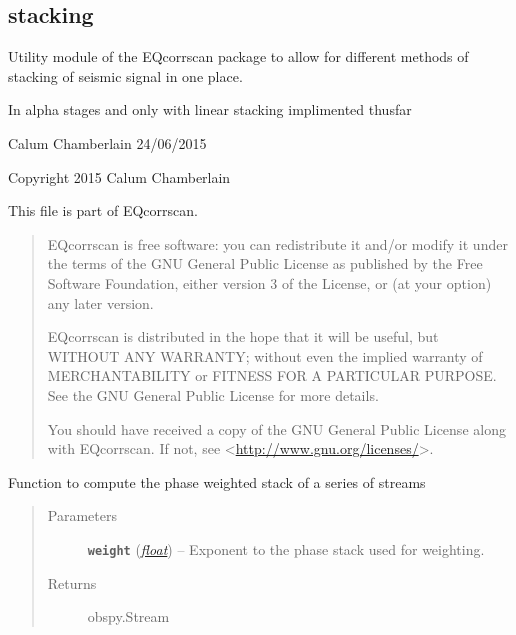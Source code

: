 \documentclass[a4paper,10pt,english]{sphinxmanual}
\begin{document}
\subsection{stacking}
\label{utils:stacking}\label{utils:module-stacking}
Utility module of the EQcorrscan package to allow for different methods of
stacking of seismic signal in one place.

In alpha stages and only with linear stacking implimented thusfar

Calum Chamberlain 24/06/2015

Copyright 2015 Calum Chamberlain

This file is part of EQcorrscan.
\begin{quote}

EQcorrscan is free software: you can redistribute it and/or modify
it under the terms of the GNU General Public License as published by
the Free Software Foundation, either version 3 of the License, or
(at your option) any later version.

EQcorrscan is distributed in the hope that it will be useful,
but WITHOUT ANY WARRANTY; without even the implied warranty of
MERCHANTABILITY or FITNESS FOR A PARTICULAR PURPOSE.  See the
GNU General Public License for more details.

You should have received a copy of the GNU General Public License
along with EQcorrscan.  If not, see \textless{}\href{http://www.gnu.org/licenses/}{http://www.gnu.org/licenses/}\textgreater{}.
\end{quote}

\begin{fulllineitems}
\label{utils:stacking.PWS_stack}
Function to compute the phase weighted stack of a series of streams
\begin{quote}\begin{description}
\item[{Parameters}] \leavevmode
\textbf{\texttt{weight}} (\href{https://docs.python.org/library/functions.html\#float}{\emph{float}}) -- Exponent to the phase stack used for weighting.

\item[{Returns}] \leavevmode
obspy.Stream

\end{description}\end{quote}

\end{fulllineitems}
\end{document}
